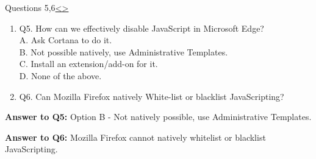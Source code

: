 \documentclass[12pt]{extarticle}
\newenvironment{instructionblock}{\Large\bgroup}{\egroup}
\newcommand{\ben}{\begin{enumerate}}
\newcommand{\een}{\end{enumerate}}
\begin{document}

	\pagebreak
	\begin{slide}{Questions 5,6}{\hyperref[slide 15]{\textless}\hyperref[slide 17]{\textgreater}}
		\begin{instructionblock}
			\ben
				\item[Q5.] How can we effectively disable JavaScript in Microsoft Edge?\\
				A. Ask Cortana to do it.\\
				B. Not possible natively, use Administrative Templates.\\
				C. Install an extension/add-on for it.\\
				D. None of the above.\\
				
				\item[Q6.] Can Mozilla Firefox natively White-list or blacklist JavaScripting?
				
			\een
		\end{instructionblock}
	\end{slide}
	\vfill
	\noindent
	\textbf{Answer to Q5:} Option B - Not natively possible, use Administrative Templates.
	
	\vspace{4mm}
	\noindent
	\textbf{Answer to Q6:} Mozilla Firefox cannot natively whitelist or blacklist JavaScripting.




	
	
	
\end{document}
